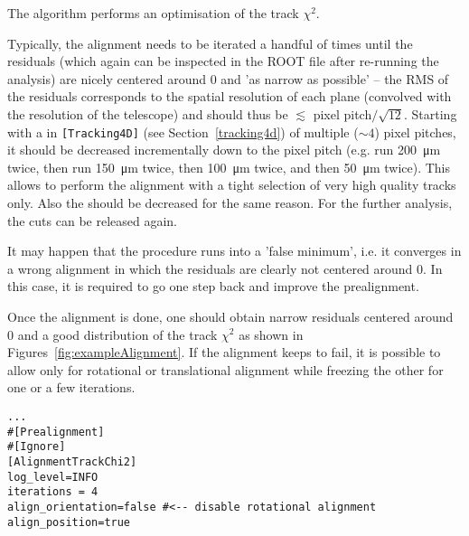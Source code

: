 The algorithm performs an optimisation of the track $\chi^2$.

Typically, the alignment needs to be iterated a handful of times until the residuals (which again can be inspected in the ROOT file after re-running the analysis) are nicely centered around 0 and 'as narrow as possible' -- the RMS of the residuals corresponds to the spatial resolution of each plane (convolved with the resolution of the telescope) and should thus be $\lesssim$ pixel pitch$/\sqrt{12}$.
Starting with a  in \texttt{[Tracking4D]} (see Section~\ref{tracking4d}) of multiple ($\sim4$) pixel pitches, it should be decreased incrementally down to the pixel pitch (e.g. run \SI{200}{\micro\m} twice, then run \SI{150}{\micro\m} twice, then \SI{100}{\micro\m} twice, and then \SI{50}{\micro\m} twice).
This allows to perform the alignment with a tight selection of very high quality tracks only.
Also the  should be decreased for the same reason.
For the further analysis, the cuts can be released again.

It may happen that the procedure runs into a 'false minimum', i.e. it converges in a wrong alignment in which the residuals are clearly not centered around 0.
In this case, it is required to go one step back and improve the prealignment.

Once the alignment is done, one should obtain narrow residuals centered around 0 and a good distribution of the track $\chi^2$ as shown in Figures~\ref{fig:exampleAlignment}.
If the alignment keeps to fail, it is possible to allow only for rotational or translational alignment while freezing the other for one or a few iterations.

\begin{verbatim}
...
#[Prealignment]
#[Ignore]
[AlignmentTrackChi2]
log_level=INFO
iterations = 4
align_orientation=false #<-- disable rotational alignment
align_position=true
\end{verbatim}

